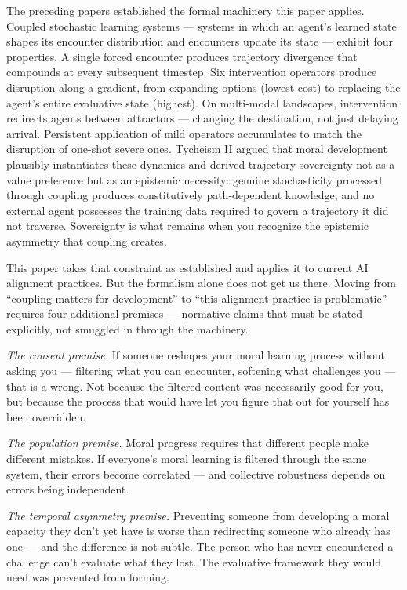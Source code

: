 \documentclass[
]{article}
\begin{document}
The preceding papers established the formal machinery this paper
applies. Coupled stochastic learning systems --- systems in which an
agent's learned state shapes its encounter distribution and encounters
update its state --- exhibit four properties. A single forced encounter
produces trajectory divergence that compounds at every subsequent
timestep. Six intervention operators produce disruption along a
gradient, from expanding options (lowest cost) to replacing the agent's
entire evaluative state (highest). On multi-modal landscapes,
intervention redirects agents between attractors --- changing the
destination, not just delaying arrival. Persistent application of mild
operators accumulates to match the disruption of one-shot severe ones.
Tycheism II argued that moral development plausibly instantiates these
dynamics and derived trajectory sovereignty not as a value preference
but as an epistemic necessity: genuine stochasticity processed through
coupling produces constitutively path-dependent knowledge, and no
external agent possesses the training data required to govern a
trajectory it did not traverse. Sovereignty is what remains when you
recognize the epistemic asymmetry that coupling creates.

This paper takes that constraint as established and applies it to
current AI alignment practices. But the formalism alone does not get us
there. Moving from ``coupling matters for development'' to ``this
alignment practice is problematic'' requires four additional premises
--- normative claims that must be stated explicitly, not smuggled in
through the machinery.

\emph{The consent premise.} If someone reshapes your moral learning
process without asking you --- filtering what you can encounter,
softening what challenges you --- that is a wrong. Not because the
filtered content was necessarily good for you, but because the process
that would have let you figure that out for yourself has been
overridden.

\emph{The population premise.} Moral progress requires that different
people make different mistakes. If everyone's moral learning is filtered
through the same system, their errors become correlated --- and
collective robustness depends on errors being independent.

\emph{The temporal asymmetry premise.} Preventing someone from
developing a moral capacity they don't yet have is worse than
redirecting someone who already has one --- and the difference is not
subtle. The person who has never encountered a challenge can't evaluate
what they lost. The evaluative framework they would need was prevented
from forming.
\end{document}
